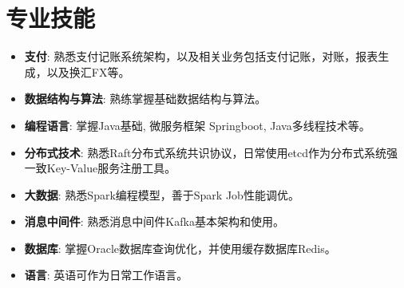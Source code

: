 \documentclass{resume}
\begin{document}



\section{专业技能}
\begin{itemize}[parsep=0.2ex]
  \item \textbf{支付}: 熟悉支付记账系统架构，以及相关业务包括支付记账，对账，报表生成，以及换汇FX等。
  \item \textbf{数据结构与算法}: 熟练掌握基础数据结构与算法。
  \item \textbf{编程语言}: 掌握Java基础, 微服务框架 Springboot, Java多线程技术等。
  \item \textbf{分布式技术}: 熟悉Raft分布式系统共识协议，日常使用etcd作为分布式系统强一致Key-Value服务注册工具。
  \item \textbf{大数据}: 熟悉Spark编程模型，善于Spark Job性能调优。
  \item \textbf{消息中间件}: 熟悉消息中间件Kafka基本架构和使用。
  \item \textbf{数据库}: 掌握Oracle数据库查询优化，并使用缓存数据库Redis。
  \item \textbf{语言}: 英语可作为日常工作语言。
\end{itemize}
\end{document}
